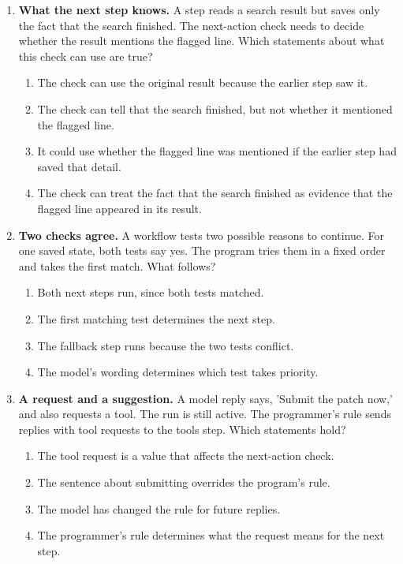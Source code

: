 \begin{enumerate}[start=21,itemsep=0.7\baselineskip]
\item\label{exercise:21} \begin{minipage}[t]{\linewidth}
\textbf{What the next step knows.} A step reads a search result but saves only the fact that the search finished. The next-action check needs to decide whether the result mentions the flagged line. Which statements about what this check can use are true?
\begin{enumerate}[label=\textnormal{(\Alph*)},leftmargin=*,itemsep=0pt]
\item The check can use the original result because the earlier step saw it.
\item The check can tell that the search finished, but not whether it mentioned the flagged line.
\item It could use whether the flagged line was mentioned if the earlier step had saved that detail.
\item The check can treat the fact that the search finished as evidence that the flagged line appeared in its result.
\end{enumerate}
\end{minipage}

\item\label{exercise:22} \begin{minipage}[t]{\linewidth}
\textbf{Two checks agree.} A workflow tests two possible reasons to continue. For one saved state, both tests say yes. The program tries them in a fixed order and takes the first match. What follows?
\begin{enumerate}[label=\textnormal{(\Alph*)},leftmargin=*,itemsep=0pt]
\item Both next steps run, since both tests matched.
\item The first matching test determines the next step.
\item The fallback step runs because the two tests conflict.
\item The model's wording determines which test takes priority.
\end{enumerate}
\end{minipage}

\item\label{exercise:23} \begin{minipage}[t]{\linewidth}
\textbf{A request and a suggestion.} A model reply says, 'Submit the patch now,' and also requests a tool. The run is still active. The programmer's rule sends replies with tool requests to the tools step. Which statements hold?
\begin{enumerate}[label=\textnormal{(\Alph*)},leftmargin=*,itemsep=0pt]
\item The tool request is a value that affects the next-action check.
\item The sentence about submitting overrides the program's rule.
\item The model has changed the rule for future replies.
\item The programmer's rule determines what the request means for the next step.
\end{enumerate}
\end{minipage}


\end{enumerate}

